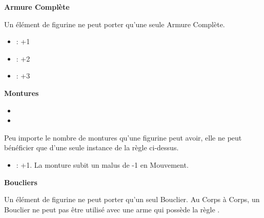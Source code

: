 \begin{multicols}{2}
\vspace{3.25ex plus 1ex minus .2ex}
\begin{center}\noindent\textbf{Armure Complète}\end{center}
\vspace{1.5ex plus .2ex}

Un élément de figurine ne peut porter qu'une seule Armure Complète.

\noindent\begin{itemize}[label={-}, topsep=0cm, itemsep=0pt]
\item \la{} : +1
\item \ha{} : +2
\item \platearmour{} : +3
\end{itemize}

\vspace{3.25ex plus 1ex minus .2ex}
\begin{center}\noindent\textbf{Montures}\end{center}
\vspace{1.5ex plus .2ex}

\noindent\begin{itemize}[label={-}, topsep=0cm, itemsep=0pt]
\item {}
\item {}
\end{itemize}

Peu importe le nombre de montures qu'une figurine peut avoir, elle ne peut bénéficier que d'une seule instance de la règle ci-dessus.

\noindent\begin{itemize}[label={-}, topsep=0cm, itemsep=0pt]
\item \barding{} : +1. La monture subit un malus de -1 en Mouvement.
\end{itemize}

\columnbreak

\vspace{3.25ex plus 1ex minus .2ex}
\begin{center}\noindent\textbf{Boucliers}\end{center}
\vspace{1.5ex plus .2ex}

Un élément de figurine ne peut porter qu'un seul Bouclier. Au Corps à Corps, un Bouclier ne peut pas être utilisé avec une arme qui possède la règle \requirestwohands{}.


\end{multicols}

